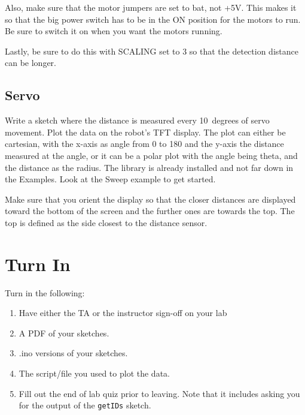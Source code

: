 Also, make sure that the motor jumpers are set to bat, not +5V. This makes it so that 
the big power switch has to be in the ON position for the motors to run. Be sure to 
switch it on when you want the motors running. 

Lastly, be sure to do this with SCALING set to 3 so that the detection distance can 
be longer.

\subsection{Servo}
Write a sketch where the distance is measured every 10~degrees of servo movement. Plot the
data on the robot's TFT display. The plot can either be cartesian, with the x-axis as angle
from 0 to 180 and the y-axis the distance measured at the angle, or it can be a polar plot 
with the angle being theta, and the distance as the radius. The \lstinline@Servo@ library 
is already installed and not far down in the Examples. Look at the Sweep example to get started.

Make sure that you orient the display so that the closer distances are displayed toward the bottom of the 
screen and the further ones are towards the top. The top is defined as the side closest to the 
distance sensor.


\section{Turn In}
Turn in the following:
\begin{enumerate}
    \item Have either the TA or the instructor sign-off on your lab
    \item A PDF of your sketches.
    \item .ino versions of your sketches.
    \item The script/file you used to plot the data.
    \item Fill out the end of lab quiz prior to leaving. Note that it includes asking you 
            for the output of the \lstinline$getIDs$ sketch. 
\end{enumerate}


